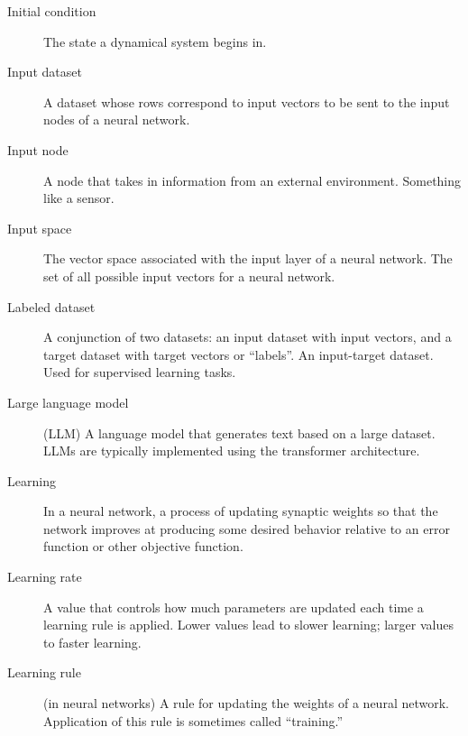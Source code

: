\begin{description}
\item[Initial condition] The state a dynamical system begins in.

\item[Input dataset] A dataset whose rows correspond to input vectors to be sent to the input nodes of a neural network.

\item[Input node] A node that takes in information from an external environment. Something like a sensor.

\item[Input space] The vector space associated with the input layer of a neural network. The set of all possible input vectors for a neural network.





\item[Labeled dataset] A conjunction of two datasets: an input dataset with input vectors, and a target dataset with target vectors or ``labels''. An input-target dataset. Used for supervised learning tasks.


\item[Large language model] (LLM) A language model that generates text based on a large dataset.  LLMs are typically implemented using the transformer architecture.

\item[Learning] In a neural network, a process of updating synaptic weights so that the network improves at producing some desired behavior relative to an error function or other objective function.

\item[Learning rate] A value that controls how much parameters are updated each time a learning rule is applied. Lower values lead to slower learning; larger values to faster learning.

\item[Learning rule] (in neural networks) A rule for updating the weights of a neural network. Application of this rule is sometimes called ``training.''


\end{description}

